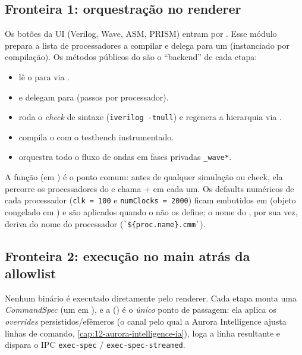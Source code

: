 \subsection{Fronteira 1: orquestração no renderer}

Os botões da UI (Verilog, Wave, ASM, PRISM) entram por
. Esse módulo prepara a lista de processadores a
compilar e delega para um  (instanciado por compilação).
Os métodos públicos do  são o ``backend'' de cada etapa:

\begin{itemize}[leftmargin=1.4em]
  \item {} lê o  para  via
        .
  \item {} e  delegam para
         (passos por processador).
  \item {} roda o \emph{check} de sintaxe
        (\lstinline|iverilog -tnull|) e regenera a hierarquia via .
  \item {} compila o  com o testbench instrumentado.
  \item {} orquestra todo o fluxo de ondas em fases
        privadas \lstinline|_wave*|.
\end{itemize}

A função  (em ) é o ponto
comum: antes de qualquer simulação ou check, ela percorre os processadores do
 e chama  +  em cada um. Os
defaults numéricos de cada processador (\lstinline|clk = 100| e
\lstinline|numClocks = 2000|) ficam embutidos em  (objeto
congelado em ) e são aplicados quando o  não
os define; o nome do , por sua vez, deriva do nome do processador
(\lstinline|`${proc.name}.cmm`|).

\subsection{Fronteira 2: execução no main atrás da allowlist}

Nenhum binário é executado diretamente pelo renderer. Cada etapa monta uma
\emph{CommandSpec} (um  em ), e a
 () é o \emph{único} ponto de
passagem: ela aplica os \emph{overrides} persistidos/efêmeros (o canal pelo qual a
Aurora Intelligence ajusta linhas de comando, \autoref{cap:12-aurora-intelligence-ia}),
loga a linha resultante e dispara o IPC \lstinline|exec-spec| / \lstinline|exec-spec-streamed|.

